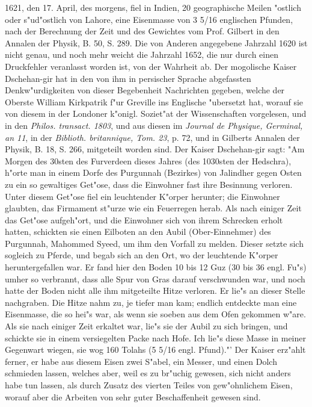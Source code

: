 \documentclass[a4paper, 11pt, oneside, polutonikogreek, german]{article}
\begin{document}
1621, den 17. April, des morgens, fiel in Indien, 20 geographische Meilen "ostlich oder s"ud"ostlich von Lahore, eine Eisenmasse von 3 5/16 englischen Pfunden, nach der Berechnung der Zeit und des Gewichtes vom Prof. Gilbert in den Annalen der Physik, B. 50, S. 289. Die von Anderen angegebene Jahrzahl 1620 ist nicht genau, und noch mehr weicht die Jahrzahl 1652, die nur durch einen Druckfehler veranlasst worden ist, von der Wahrheit ab. Der mogolische Kaiser Dschehan-gir hat in den von ihm in persischer Sprache abgefassten Denkw"urdigkeiten von dieser Begebenheit Nachrichten gegeben, welche der Oberste William Kirkpatrik f"ur Greville ins Englische "ubersetzt hat, worauf sie von diesem in der Londoner k"onigl. Soziet"at der Wissenschaften vorgelesen, und in den \emph{Philos. transact. 1803}, und aus diesen im \emph{Journal de Physique, Germinal, an 11}, in der \emph{Biblioth. britannique, Tom. 23}, p. 72, und in Gilberts Annalen der Physik, B. 18, S. 266, mitgeteilt worden sind. Der Kaiser Dschehan-gir sagt: "Am Morgen des 30sten des Furverdeen dieses Jahres (des 1030sten der Hedschra), h"orte man in einem Dorfe des Purgunnah (Bezirkes) von Jalindher gegen Osten zu ein so gewaltiges Get"ose, dass die Einwohner fast ihre Besinnung verloren. Unter diesem Get"ose fiel ein leuchtender K"orper herunter; die Einwohner glaubten, das Firmament st"urze wie ein Feuerregen herab. Als nach einiger Zeit das Get"ose aufgeh"ort, und die Einwohner sich von ihrem Schrecken erholt hatten, schickten sie einen Eilboten an den Aubil (Ober-Einnehmer) des Purgunnah, Mahommed Syeed, um ihm den Vorfall zu melden. Dieser setzte sich sogleich zu Pferde, und begab sich an den Ort, wo der leuchtende K"orper heruntergefallen war. Er fand hier den Boden 10 bis 12 Guz (30 bis 36 engl. Fu"s) umher so verbrannt, dass alle Spur von Gras darauf verschwunden war, und noch hatte der Boden nicht alle ihm mitgeteilte Hitze verloren. Er lie"s an dieser Stelle nachgraben. Die Hitze nahm zu, je tiefer man kam; endlich entdeckte man eine Eisenmasse, die so hei"s war, als wenn sie soeben aus dem Ofen gekommen w"are. Als sie nach einiger Zeit erkaltet war, lie"s sie der Aubil zu sich bringen, und schickte sie in einem versiegelten Packe nach Hofe. Ich lie"s diese Masse in meiner Gegenwart wiegen, sie wog 160 Tolahs (5 5/16 engl. Pfund)."' Der Kaiser erz"ahlt ferner, er habe aus diesem Eisen zwei S"abel, ein Messer, und einen Dolch schmieden lassen, welches aber, weil es zu br"uchig gewesen, sich nicht anders habe tun lassen, als durch Zusatz des vierten Teiles von gew"ohnlichem Eisen, worauf aber die Arbeiten von sehr guter Beschaffenheit gewesen sind.
\end{document}
